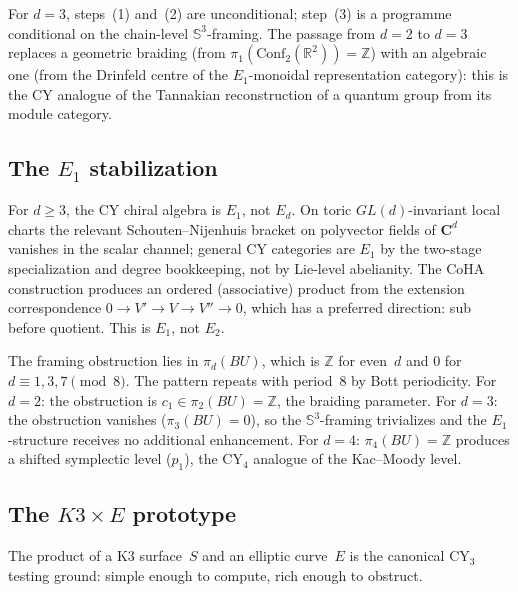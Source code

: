 \documentclass[11pt,reqno]{amsart}
\theoremstyle{definition}
\theoremstyle{remark}
\providecommand{\Conf}{\mathrm{Conf}}
\renewcommand{\Bbbk}{\mathbf{C}}
\numberwithin{equation}{section}
\begin{document}
For $d = 3$, steps~(1) and~(2) are unconditional; step~(3) is
a programme conditional on the chain-level
$\mathbb{S}^3$-framing. The passage from $d = 2$ to $d = 3$
replaces a geometric braiding (from
$\pi_1(\Conf_2(\mathbb{R}^2)) = \mathbb{Z}$) with an
algebraic one (from the Drinfeld centre of the
$E_1$-monoidal representation category): this is the CY
analogue of the Tannakian reconstruction of a quantum group
from its module category.

\subsection{The $E_1$ stabilization}
\label{ssec:e1-stabilization}

For $d \ge 3$, the CY chiral algebra is $E_1$, not $E_d$.
On toric $GL(d)$-invariant local charts the relevant
Schouten--Nijenhuis bracket on polyvector fields of $\Bbbk^d$
vanishes in the scalar channel; general CY categories are
$E_1$ by the two-stage specialization and degree bookkeeping,
not by Lie-level abelianity.
The CoHA construction produces an ordered (associative) product
from the extension correspondence
$0 \to V' \to V \to V'' \to 0$, which has a preferred
direction: sub before quotient. This is $E_1$, not $E_2$.

The framing obstruction lies in $\pi_d(BU)$, which is
$\mathbb{Z}$ for even~$d$ and $0$ for $d \equiv 1, 3, 7
\pmod{8}$. The pattern repeats with period~$8$ by Bott
periodicity. For $d = 2$: the obstruction is
$c_1 \in \pi_2(BU) = \mathbb{Z}$, the braiding parameter.
For $d = 3$: the obstruction vanishes
($\pi_3(BU) = 0$), so the $\mathbb{S}^3$-framing trivializes
and the $E_1$-structure receives no additional enhancement.
For $d = 4$: $\pi_4(BU) = \mathbb{Z}$ produces a shifted
symplectic level ($p_1$), the CY$_4$ analogue of the
Kac--Moody level.

\subsection{The $K3 \times E$ prototype}
\label{ssec:k3-times-e}

The product of a K3 surface~$S$ and an elliptic curve~$E$
is the canonical CY$_3$ testing ground: simple enough to
compute, rich enough to obstruct.
\end{document}

